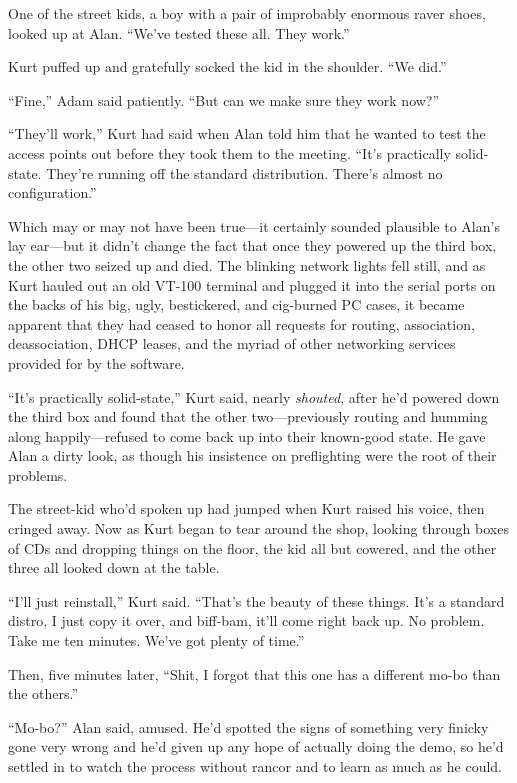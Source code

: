 One of the street kids, a boy with a pair of improbably enormous raver
shoes, looked up at Alan.  ``We've tested these all.  They work.''

Kurt puffed up and gratefully socked the kid in the shoulder.  ``We
did.''

``Fine,'' Adam said patiently.  ``But can we make sure they work
now?''

``They'll work,'' Kurt had said when Alan told him that he wanted to
test the access points out before they took them to the meeting. 
``It's practically solid-state.  They're running off the standard
distribution.  There's almost no configuration.''

Which may or may not have been true---it certainly sounded plausible
to Alan's lay ear---but it didn't change the fact that once they
powered up the third box, the other two seized up and died.  The
blinking network lights fell still, and as Kurt hauled out an old
VT-100 terminal and plugged it into the serial ports on the backs of
his big, ugly, bestickered, and cig-burned PC cases, it became
apparent that they had ceased to honor all requests for routing,
association, deassociation, DHCP leases, and the myriad of other
networking services provided for by the software.

``It's practically solid-state,'' Kurt said, nearly \textit{shouted},
after he'd powered down the third box and found that the other
two---previously routing and humming along happily---refused to come
back up into their known-good state.  He gave Alan a dirty look, as
though his insistence on preflighting were the root of their problems.

The street-kid who'd spoken up had jumped when Kurt raised his voice,
then cringed away.  Now as Kurt began to tear around the shop, looking
through boxes of CDs and dropping things on the floor, the kid all but
cowered, and the other three all looked down at the table.

``I'll just reinstall,'' Kurt said.  ``That's the beauty of these
things.  It's a standard distro, I just copy it over, and biff-bam,
it'll come right back up.  No problem.  Take me ten minutes.  We've
got plenty of time.''

Then, five minutes later, ``Shit, I forgot that this one has a
different mo-bo than the others.''

``Mo-bo?'' Alan said, amused.  He'd spotted the signs of something
very finicky gone very wrong and he'd given up any hope of actually
doing the demo, so he'd settled in to watch the process without rancor
and to learn as much as he could.

